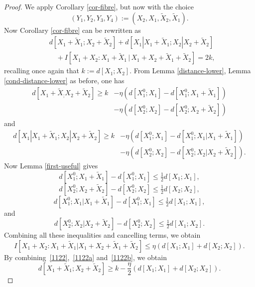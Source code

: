 \begin{proof}
  We apply Corollary \ref{cor-fibre}, but now with the choice
  \[
    (Y_1,Y_2,Y_3,Y_4) := (X_2, X_1, \tilde X_2, \tilde X_1).
  \]
  Now Corollary \ref{cor-fibre} can be rewritten as
  \begin{align*}
    &d[X_1+\tilde X_1;X_2+\tilde X_2] + d[X_1|X_1+\tilde X_1; X_2|X_2+\tilde X_2] \\
    &\quad + I[ X_1+X_2 : X_1 + \tilde X_1 \,|\, X_1+X_2+\tilde X_1+\tilde X_2 ] = 2k,
  \end{align*}
  recalling once again that $k := d[X_1;X_2]$.  From Lemma \ref{distance-lower}, Lemma \ref{cond-distance-lower} as before, one has
  \begin{align}
    \nonumber
    d[X_1+\tilde X_; X_2+\tilde X_2] \geq k &- \eta(d[X^0_1;X_1] - d[X^0_1;X_1+\tilde X_1]) \\
    &- \eta(d[X^0_2;X_2] - d[X^0_2;X_2+\tilde X_2])
  \label{1122}
  \end{align}
  and
  \begin{align*}
    d[X_1|X_1+\tilde X_1; X_2|X_2+\tilde X_2]   \geq k &- \eta (d[X^0_1;X_1] - d[X^0_1;X_1|X_1+\tilde X_1]) \\& - \eta (d[X^0_2;X_2] - d[X^0_2;X_2|X_2+\tilde X_2]) .
  \end{align*}
  Now Lemma \ref{first-useful} gives
  \begin{equation}\label{1122a} d[X^0_1;X_1+\tilde X_1] - d[X^0_1;X_1] \leq \tfrac{1}{2} d[X_1;X_1],\end{equation}
  \begin{equation}\label{1122b}
    d[X^0_2;X_2+\tilde X_2] - d[X^0_2;X_2] \leq \tfrac{1}{2} d[X_2;X_2],
  \end{equation}
  \[
    d[X^0_1;X_1|X_1+\tilde X_1] -  d[X^0_1;X_1] \leq  \tfrac{1}{2} d[X_1;X_1],
  \]
  and
  \[
    d[X^0_2;X_2|X_2+\tilde X_2] -  d[X^0_2;X_2] \leq \tfrac{1}{2} d[X_1;X_2].
    \]
  Combining all these inequalities and cancelling terms, we obtain
  \begin{equation}\label{combined}
  I[ X_1+X_2 : X_1 + \tilde X_1 | X_1+X_2+\tilde X_1+\tilde X_2 ] \leq \eta ( d[X_1; X_1] + d[X_2; X_2] ).
  \end{equation}
By combining~\eqref{1122},~\eqref{1122a} and~\eqref{1122b}, we obtain
  \begin{equation}\label{d12}
    d[X_1+\tilde X_1; X_2+\tilde X_2] \geq k - \frac{\eta}{2} ( d[X_1; X_1] + d[X_2;X_2] ).
  \end{equation}

\end{proof}
